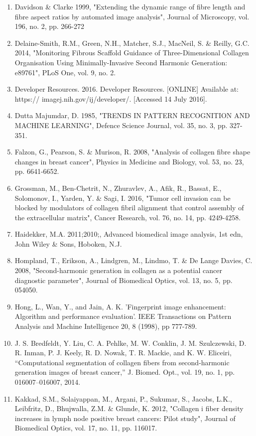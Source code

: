\documentclass[12pt,a4paper]{article}
\begin{document}
\begin{enumerate}
\item Davidson \& Clarke 1999, "Extending the dynamic range of fibre length and fibre aspect ratios by automated image analysis", Journal of Microscopy, vol. 196, no. 2, pp. 266-272
\item Delaine-Smith, R.M., Green, N.H., Matcher, S.J., MacNeil, S. \& Reilly, G.C. 2014, "Monitoring Fibrous Scaffold Guidance of Three-Dimensional Collagen Organisation Using Minimally-Invasive Second Harmonic Generation: e89761", PLoS One, vol. 9, no. 2.
\item Developer Resources. 2016. Developer Resources. [ONLINE] Available at: https:// imagej.nih.gov/ij/developer/. [Accessed 14 July 2016].
\item Dutta Majumdar, D. 1985, "TRENDS IN PATTERN RECOGNITION AND MACHINE LEARNING", Defence Science Journal, vol. 35, no. 3, pp. 327-351.
\item Falzon, G., Pearson, S. \& Murison, R. 2008, "Analysis of collagen fibre shape changes in breast cancer", Physics in Medicine and Biology, vol. 53, no. 23, pp. 6641-6652.
\item Grossman, M., Ben-Chetrit, N., Zhuravlev, A., Afik, R., Bassat, E., Solomonov, I., Yarden, Y. \& Sagi, I. 2016, "Tumor cell invasion can be blocked by modulators of collagen fibril alignment that control assembly of the extracellular matrix", Cancer Research, vol. 76, no. 14, pp. 4249-4258.
\item Haidekker, M.A. 2011;2010;, Advanced biomedical image analysis, 1st edn, John Wiley \& Sons, Hoboken, N.J.
\item Hompland, T., Erikson, A., Lindgren, M., Lindmo, T. & De Lange Davies, C. 2008, "Second-harmonic generation in collagen as a potential cancer diagnostic parameter", Journal of Biomedical Optics, vol. 13, no. 5, pp. 054050.
\item Hong, L., Wan, Y., and Jain, A. K. 'Fingerprint image enhancement: Algorithm and performance evaluation'. IEEE Transactions on Pattern Analysis and Machine Intelligence 20, 8 (1998), pp 777-789.
\item J. S. Bredfeldt, Y. Liu, C. A. Pehlke, M. W. Conklin, J. M. Szulczewski, D. R. Inman, P. J. Keely, R. D. Nowak, T. R. Mackie, and K. W. Eliceiri, “Computational segmentation of collagen fibers from second-harmonic generation images of breast cancer,” J. Biomed. Opt., vol. 19, no. 1, pp. 016007–016007, 2014.
\item Kakkad, S.M., Solaiyappan, M., Argani, P., Sukumar, S., Jacobs, L.K., Leibfritz, D., Bhujwalla, Z.M. \& Glunde, K. 2012, "Collagen i fiber density increases in lymph node positive breast cancers: Pilot study", Journal of Biomedical Optics, vol. 17, no. 11, pp. 116017.

\end{enumerate}
\end{document}
